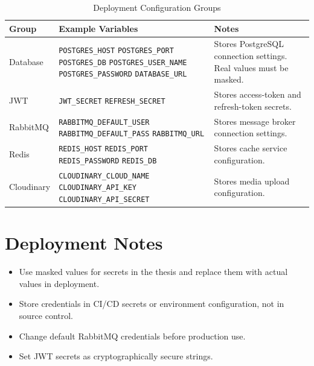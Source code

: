 \begin{table}[H]
\centering
\caption{Deployment Configuration Groups}
\label{tab:deployment-config-groups}
\footnotesize
\renewcommand{\arraystretch}{1.2}
\begin{tabularx}{\textwidth}{|p{2.6cm}|>{\raggedright\arraybackslash}X|>{\raggedright\arraybackslash}p{4.2cm}|}
\hline
\textbf{Group} & \textbf{Example Variables} & \textbf{Notes} \\
\hline
Database & \texttt{POSTGRES\_HOST}\newline
\texttt{POSTGRES\_PORT}\newline
\texttt{POSTGRES\_DB}\newline
\texttt{POSTGRES\_USER\_NAME}\newline
\texttt{POSTGRES\_PASSWORD}\newline
\texttt{DATABASE\_URL} & Stores PostgreSQL connection settings. Real values must be masked. \\
\hline
JWT & \texttt{JWT\_SECRET}\newline
\texttt{REFRESH\_SECRET} & Stores access-token and refresh-token secrets. \\
\hline
RabbitMQ & \texttt{RABBITMQ\_DEFAULT\_USER}\newline
\texttt{RABBITMQ\_DEFAULT\_PASS}\newline
\texttt{RABBITMQ\_URL} & Stores message broker connection settings. \\
\hline
Redis & \texttt{REDIS\_HOST}\newline
\texttt{REDIS\_PORT}\newline
\texttt{REDIS\_PASSWORD}\newline
\texttt{REDIS\_DB} & Stores cache service configuration. \\
\hline
Cloudinary & \texttt{CLOUDINARY\_CLOUD\_NAME}\newline
\texttt{CLOUDINARY\_API\_KEY}\newline
\texttt{CLOUDINARY\_API\_SECRET} & Stores media upload configuration. \\
\hline
\end{tabularx}
\end{table}

\section{Deployment Notes}

\begin{itemize}
    \item Use masked values for secrets in the thesis and replace them with actual values in deployment.
    \item Store credentials in CI/CD secrets or environment configuration, not in source control.
    \item Change default RabbitMQ credentials before production use.
    \item Set JWT secrets as cryptographically secure strings.
\end{itemize}
